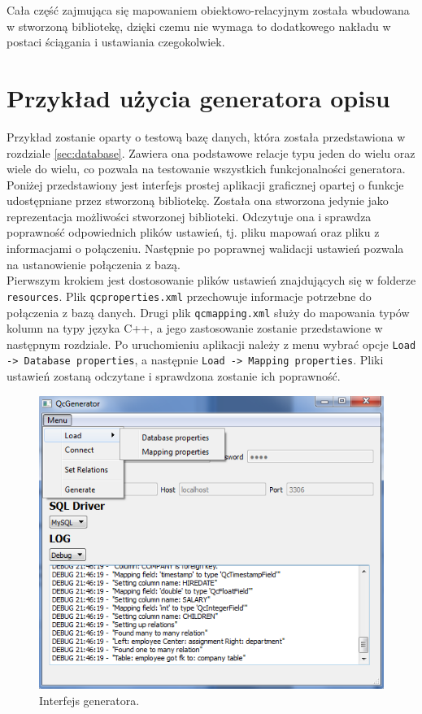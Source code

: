 \documentclass[12pt]{report}
\begin{document}
 Cała część zajmująca się mapowaniem obiektowo-relacyjnym została wbudowana w stworzoną bibliotekę, dzięki czemu nie wymaga to dodatkowego nakładu w postaci ściągania i ustawiania czegokolwiek.

{\color{black}
\section{Przykład użycia generatora opisu}
Przykład zostanie oparty o testową bazę danych, która została przedstawiona w rozdziale \ref{sec:database}. Zawiera ona podstawowe relacje typu jeden do wielu oraz wiele do wielu, co pozwala na testowanie wszystkich funkcjonalności generatora. \\
\indent Poniżej przedstawiony jest interfejs prostej aplikacji graficznej opartej o funkcje udostępniane przez stworzoną bibliotekę. Została ona stworzona jedynie jako reprezentacja możliwości stworzonej biblioteki. Odczytuje ona i sprawdza poprawność odpowiednich plików ustawień, tj. pliku mapowań oraz pliku z informacjami o połączeniu. Następnie po poprawnej walidacji ustawień pozwala na ustanowienie połączenia z bazą. \\
\indent Pierwszym krokiem jest dostosowanie plików ustawień znajdujących się w folderze {\tt resources}. Plik {\tt qcproperties.xml} przechowuje informacje potrzebne do połączenia z bazą danych. Drugi plik {\tt qcmapping.xml} służy do mapowania typów kolumn na typy języka C++, a jego zastosowanie zostanie przedstawione w następnym rozdziale. Po uruchomieniu aplikacji należy z menu wybrać opcje {\tt Load -> Database properties}, a następnie {\tt Load -> Mapping proper\-ties}. Pliki ustawień zostaną odczytane i sprawdzona zostanie ich poprawność.

\begin{figure}[h]
	\centering
	\includegraphics[width=.8\textwidth]{images/qubic-gen.png}
	\caption{Interfejs generatora.}
\end{figure}
\FloatBarrier	

}
\end{document}
